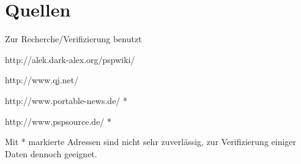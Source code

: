 \documentclass[mode=print,paper=screen,style=jefka]{powerdot}
\begin{document}
\section{Quellen}
\begin{slide}{Zur Recherche/Verifizierung benutzt}
	\begin{list}{-}{}
		\item{http://alek.dark-alex.org/pspwiki/}
		\item{http://www.qj.net/}
		\item{http://www.portable-news.de/ *}
		\item{http://www.pspsource.de/ *}
	\end{list}
	Mit * markierte Adressen sind nicht sehr zuverlässig, zur Verifizierung einiger Daten dennoch geeignet.
\end{slide}
\end{document}
